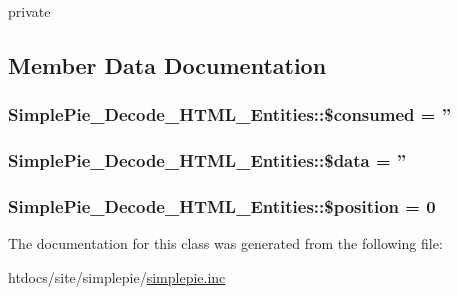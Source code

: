 private 

\subsection{Member Data Documentation}
\hypertarget{class_simple_pie___decode___h_t_m_l___entities_acf3fb93427ab30b8d8f207ddc6dcdbe0}{
\subsubsection[{\$consumed}]{\setlength{\rightskip}{0pt plus 5cm}Simple\-Pie\-\_\-\-Decode\-\_\-\-H\-T\-M\-L\-\_\-\-Entities\-::\$consumed = ''}}\label{class_simple_pie___decode___h_t_m_l___entities_acf3fb93427ab30b8d8f207ddc6dcdbe0}
\hypertarget{class_simple_pie___decode___h_t_m_l___entities_a59c6ca6838e6f03bc69e1fa1ba51fa74}{
\subsubsection[{\$data}]{\setlength{\rightskip}{0pt plus 5cm}Simple\-Pie\-\_\-\-Decode\-\_\-\-H\-T\-M\-L\-\_\-\-Entities\-::\$data = ''}}\label{class_simple_pie___decode___h_t_m_l___entities_a59c6ca6838e6f03bc69e1fa1ba51fa74}
\hypertarget{class_simple_pie___decode___h_t_m_l___entities_abbf26bb22f76c1cbe09aaa17e18a7377}{
\subsubsection[{\$position}]{\setlength{\rightskip}{0pt plus 5cm}Simple\-Pie\-\_\-\-Decode\-\_\-\-H\-T\-M\-L\-\_\-\-Entities\-::\$position = 0}}\label{class_simple_pie___decode___h_t_m_l___entities_abbf26bb22f76c1cbe09aaa17e18a7377}


The documentation for this class was generated from the following file\-:\begin{DoxyCompactItemize}
\item 
htdocs/site/simplepie/\hyperlink{simplepie_8inc}{simplepie.\-inc}\end{DoxyCompactItemize}
